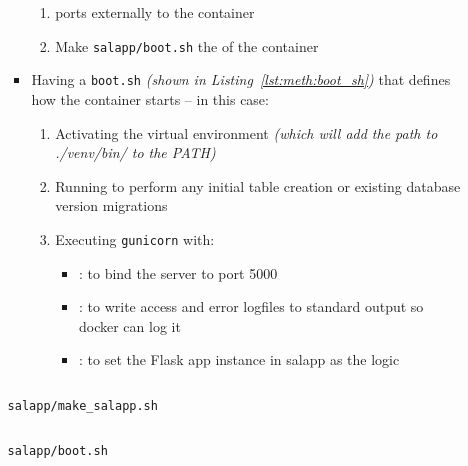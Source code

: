\begin{enumerate}[leftmargin=0em,label=\protect\listlabelcircle{\arabic*}]
\begin{enumerate}[label=\Roman*~\textcolor{light-gray}{|}]
\begin{itemize}
\begin{enumerate}[label=\textcolor{deep-gray}{\roman*\textasciitilde}]
              \item {} ports externally to the container
              \item Make \texttt{salapp/boot.sh} the  of the container
            \end{enumerate}
          \item Having a \texttt{boot.sh} \textit{(shown in Listing~\ref{lst:meth:boot_sh})} that defines how the container starts -- in this case:
            \begin{enumerate}[label=\textcolor{deep-gray}{\roman*\textasciitilde}]
              \item Activating the virtual environment \textit{(which will add the path to ./venv/bin/ to the PATH)}
              \item Running  to perform any initial table creation or existing database version migrations
              \item Executing \texttt{gunicorn} with:
                \begin{itemize}
                  \item {}: to bind the server to port 5000
                  \item {}: to write access and error logfiles to standard output so docker can log it
                  \item {}: to set the Flask app instance in salapp as the logic
                \end{itemize}
            \end{enumerate}
        \end{itemize}
        \begin{listing}[H]
          \captionsetup{skip=\skiplistingcaptionlen}
          \inputminted[breakanywhere]{bash}{../uswacs-2-iy2d502-salapp/make_salapp.sh}
          \caption{\texttt{salapp/make\_salapp.sh}}
          \label{lst:meth:make_salapp_sh}
        \end{listing}
        \begin{listing}[H]
          \captionsetup{skip=\skiplistingcaptionlen}
          \inputminted[breakanywhere]{bash}{../uswacs-2-iy2d502-salapp/boot.sh}
          \caption{\texttt{salapp/boot.sh}}
          \label{lst:meth:boot_sh}
        \end{listing}
        \begin{listing}[H]
          \captionsetup{skip=\skiplistingcaptionlen}
          \inputminted[breakanywhere]{bash}{../uswacs-2-iy2d502-salapp/Dockerfile}

\end{listing}
\end{enumerate}
\end{enumerate}
